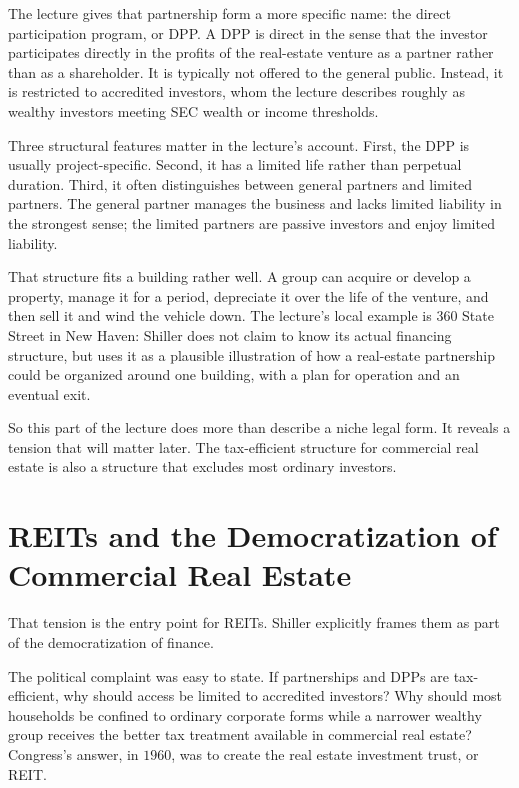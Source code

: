 The lecture gives that partnership form a more specific name: the direct participation program, or DPP. A DPP is direct in the sense that the investor participates directly in the profits of the real-estate venture as a partner rather than as a shareholder. It is typically not offered to the general public. Instead, it is restricted to accredited investors, whom the lecture describes roughly as wealthy investors meeting SEC wealth or income thresholds.

Three structural features matter in the lecture's account. First, the DPP is usually project-specific. Second, it has a limited life rather than perpetual duration. Third, it often distinguishes between general partners and limited partners. The general partner manages the business and lacks limited liability in the strongest sense; the limited partners are passive investors and enjoy limited liability.

That structure fits a building rather well. A group can acquire or develop a property, manage it for a period, depreciate it over the life of the venture, and then sell it and wind the vehicle down. The lecture's local example is 360 State Street in New Haven: Shiller does not claim to know its actual financing structure, but uses it as a plausible illustration of how a real-estate partnership could be organized around one building, with a plan for operation and an eventual exit.

So this part of the lecture does more than describe a niche legal form. It reveals a tension that will matter later. The tax-efficient structure for commercial real estate is also a structure that excludes most ordinary investors.

\section{REITs and the Democratization of Commercial Real Estate}

That tension is the entry point for REITs. Shiller explicitly frames them as part of the democratization of finance.

The political complaint was easy to state. If partnerships and DPPs are tax-efficient, why should access be limited to accredited investors? Why should most households be confined to ordinary corporate forms while a narrower wealthy group receives the better tax treatment available in commercial real estate? Congress's answer, in \(1960\), was to create the real estate investment trust, or REIT.

